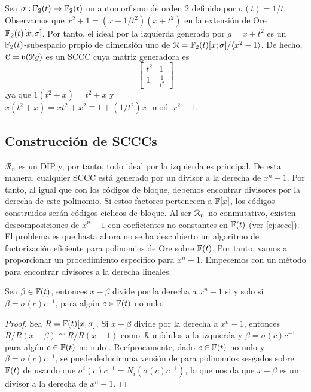 \begin{ejemplo}\label{ej:sccc}
Sea $\sigma : \mathbb{F}_2(t) \rightarrow \mathbb{F}_2(t)$ un automorfismo de orden $2$ definido por $\sigma(t) = 1/t$. Observamos que $x^2 + 1 = (x + 1/t^2)(x + t^2)$ en la extensión de Ore $\mathbb{F}_2(t)[x;\sigma]$. Por tanto, el ideal por la izquierda generado por $g = x + t^2$ es un $\mathbb{F}_2(t)$-subespacio propio de dimensión uno de $\mathcal R = \mathbb{F}_2(t)[x;\sigma]/\langle x^2 - 1 \rangle$. De hecho, $\mathcal C = \mathfrak{v}(\mathcal R g)$ es un SCCC cuya matriz generadora es 
$$
\begin{bmatrix}
    t^2 & 1 \\
    1 & \frac{1}{t^2}
\end{bmatrix}
$$ 
,ya que $1(t^2 + x) = t^2 + x$ y $x(t^2 + x) = xt^2 + x^2 \equiv 1 + (1/t^2)x \mod x^2 - 1.$

\subsection{Construcción de SCCCs}

$\mathcal{R}_n$ es un DIP y, por tanto, todo ideal por la izquierda es principal. De esta manera, cualquier SCCC está generado por un divisor a la derecha de $x^n - 1$. Por tanto, al igual que con los códigos de bloque, debemos encontrar divisores por la derecha de este polinomio. Si estos factores pertenecen a $\mathbb{F}[x]$, los códigos construidos serán códigos cíclicos de bloque. Al ser $\mathcal R_n$ no conmutativo, existen descomposiciones de $x^n - 1$ con coeficientes no constantes en $\mathbb{F}(t)$ (ver \ref{ej:sccc}). El problema es que hasta ahora no se ha descubierto un algoritmo de factorización eficiente para polinomios de Ore sobre $\mathbb{F}(t)$. Por tanto, vamos a proporcionar un procedimiento específico para $x^n-1$. Empecemos con un método para encontrar divisores a la derecha lineales.

\begin{proposicion}\label{prop:c}
Sea $\beta \in \mathbb{F}(t)$, entonces $x - \beta$ divide por la derecha a $x^n - 1$ si y solo si $\beta = \sigma(c)c^{-1}$, para algún $c \in \mathbb{F}(t)$ no nulo.
\end{proposicion}

\begin{proof}
Sea $R = \mathbb{F}(t)[x;\sigma]$. Si $x - \beta$ divide por la derecha a $x^n -1$, entonces $R/R(x - \beta) \cong R/R(x-1)$ como $\mathcal R$-módulos a la izquierda y $\beta = \sigma(c)c^{-1}$ para algún $c \in \mathbb{F}(t)$ no nulo \cite[Proposición 2.4]{modulos}. 
Recíprocamente, dado $c \in \mathbb{F}(t)$ no nulo y $\beta = \sigma(c)c^{-1}$, se puede deducir una versión de \cite[Lema 4]{Chaussade} para polinomios sesgados sobre $\mathbb{F}(t)$ de \cite[Proposición 1.3.11]{jacobson1996} usando que $\sigma^i(c)c^{-1} = N_i(\sigma(c)c^{-1})$, lo que nos da que $x - \beta$ es un divisor a la derecha de $x^n - 1$.
\end{proof}


\end{ejemplo}
